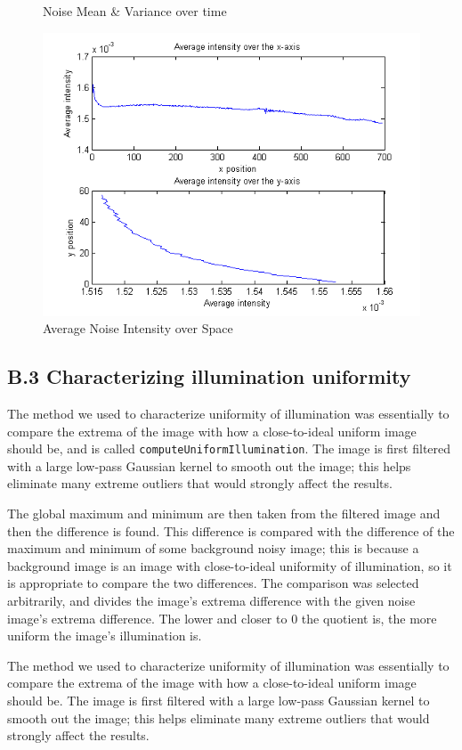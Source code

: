 \documentclass{article}
\begin{document}
\begin{figure}[b]
\begin{minipage}[b]{0.45\linewidth}
\caption{Noise Mean \& Variance over time}
\label{fig:noise_mean_var_time}
\end{minipage}
\end{figure}

\begin{figure}[t]
\centering
\includegraphics[width=0.45\linewidth]{figures/noise_intensity_over_space.png}
\caption{Average Noise Intensity over Space}
\label{fig:noise_intensity_space}
\end{figure}


\subsection*{B.3 Characterizing illumination uniformity}

The method we used to characterize uniformity of illumination was essentially to compare the extrema of the image with how a close-to-ideal uniform image should be, and is called \texttt{computeUniformIllumination}. The image is first filtered with a large low-pass Gaussian kernel to smooth out the image; this helps eliminate many extreme outliers that would strongly affect the results.

The global maximum and minimum are then taken from the filtered image and then the difference is found. This difference is compared with the difference of the maximum and minimum of some background noisy image; this is because a background image is an image with close-to-ideal uniformity of illumination, so it is appropriate to compare the two differences. The comparison was selected arbitrarily, and divides the image's extrema difference with the given noise image's extrema difference. The lower and closer to 0 the quotient is, the more uniform the image's illumination is.

The method we used to characterize uniformity of illumination was essentially to compare the extrema of the image with how a close-to-ideal uniform image should be. The image is first filtered with a large low-pass Gaussian kernel to smooth out the image; this helps eliminate many extreme outliers that would strongly affect the results.
\end{document}

